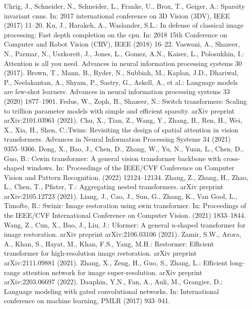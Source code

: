 \documentclass[conference]{IEEEtran}
\begin{document}
\begin{thebibliography}{00}
 Uhrig, J., Schneider, N., Schneider, L., Franke, U., Brox, T., Geiger, A.: Sparsity invariant cnns. In: 2017 international conference on 3D Vision (3DV), IEEE (2017) 11–20.
 Ku, J., Harakeh, A., Waslander, S.L.: In defense of classical image processing: Fast depth completion on the cpu. In: 2018 15th Conference on Computer and Robot Vision (CRV), IEEE (2018) 16–22.
 Vaswani, A., Shazeer, N., Parmar, N., Uszkoreit, J., Jones, L., Gomez, A.N., Kaiser, L., Polosukhin, I.: Attention is all you need. Advances in neural information processing systems 30 (2017).
 Brown, T., Mann, B., Ryder, N., Subbiah, M., Kaplan, J.D., Dhariwal, P., Neelakantan, A., Shyam, P., Sastry, G., Askell, A., et al.: Language models are few-shot learners. Advances in neural information processing systems 33 (2020) 1877–1901.
Fedus, W., Zoph, B., Shazeer, N.: Switch transformers: Scaling to trillion parameter models with simple and efficient sparsity. arXiv preprint arXiv:2101.03961 (2021).
 Chu, X., Tian, Z., Wang, Y., Zhang, B., Ren, H., Wei, X., Xia, H., Shen, C.:Twins: Revisiting the design of spatial attention in vision transformers. Advances in Neural Information Processing Systems 34 (2021) 9355–9366.
 Dong, X., Bao, J., Chen, D., Zhang, W., Yu, N., Yuan, L., Chen, D., Guo, B.: Cswin transformer: A general vision transformer backbone with cross-shaped windows. In: Proceedings of the IEEE/CVF Conference on Computer Vision and Pattern Recognition. (2022) 12124–12134.
 Zhang, Z., Zhang, H., Zhao, L., Chen, T., Pfister, T.: Aggregating nested transformers. arXiv preprint arXiv:2105.12723 (2021).
 Liang, J., Cao, J., Sun, G., Zhang, K., Van Gool, L., Timofte, R.: Swinir: Image restoration using swin transformer. In: Proceedings of the IEEE/CVF International Conference on Computer Vision. (2021) 1833–1844.
 Wang, Z., Cun, X., Bao, J., Liu, J.: Uformer: A general u-shaped transformer for
image restoration. arXiv preprint arXiv:2106.03106 (2021).
 Zamir, S.W., Arora, A., Khan, S., Hayat, M., Khan, F.S., Yang, M.H.: Restormer: Efficient transformer for high-resolution image restoration. arXiv preprint arXiv:2111.09881 (2021).
 Zhang, X., Zeng, H., Guo, S., Zhang, L.: Efficient long-range attention network for image super-resolution. arXiv preprint arXiv:2203.06697 (2022).
 Dauphin, Y.N., Fan, A., Auli, M., Grangier, D.: Language modeling with gated convolutional networks. In: International conference on machine learning, PMLR (2017) 933–941.

\end{thebibliography}
\end{document}
